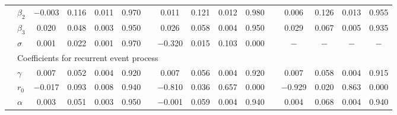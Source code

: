 \begin{table}[H]
{\begin{tabular}{clcccccccccccccc}
&  $\beta_2$ & $-$0.003 & 0.116 & 0.011 & 0.970 & & 0.011 & 0.121 & 0.012 & 0.980 && 0.006 & 0.126 & 0.013 & 0.955\\
&  $\beta_3$ & 0.020 & 0.048 & 0.003 & 0.950 & & 0.026 & 0.058 & 0.004 & 0.950 && 0.029 & 0.067 & 0.005 & 0.935\\
&  $\sigma$ & 0.001 & 0.022 & 0.001 & 0.970 & & $-$0.320 & 0.015 & 0.103 & 0.000 && $-$ & $-$ & $-$ & $-$ \\
&  \multicolumn{12}{l}{Coefficients for recurrent event process}\\
&  $\gamma$ & 0.007 & 0.052 & 0.004 & 0.920 & & 0.007 & 0.056 & 0.004 & 0.920 && 0.007 & 0.058 & 0.004 & 0.915\\
&  $r_0$ & $-$0.017 & 0.093 & 0.008 & 0.940 && $-$0.810 & 0.036 & 0.657 & 0.000 && $-$0.929 & 0.020 & 0.863 & 0.000\\
&  $\alpha$ & 0.003 & 0.051& 0.003 & 0.950 & & $-$0.001 & 0.059 & 0.004 & 0.940 && 0.004 & 0.068 & 0.004 & 0.940\\
   \hline
\end{tabular}
}
\end{table}



